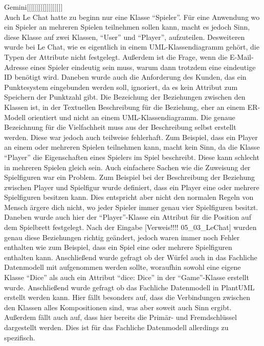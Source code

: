 Gemini[[[[[[[[[]]]]]]]]]\\

Auch Le Chat hatte zu beginn nur eine Klasse ``Spieler''. Für eine Anwendung wo ein Spieler an mehreren Spielen teilnehmen sollen kann, macht es jedoch Sinn, diese 
Klasse auf zwei Klassen, ``User'' und ``Player'', aufzuteilen. Desweiteren wurde bei Le Chat, wie es eigentlich in einem UML-Klassendiagramm gehört, die Typen der
Attribute nicht festgelegt. Außerdem ist die Frage, wenn die E-Mail-Adresse eines Spieler eindeutig sein muss, warum dann trotzdem eine eindeutige ID benötigt wird.
Daneben wurde auch die Anforderung des Kunden, das ein Punktesystem eingebunden werden soll, ignoriert, da es kein Attribut zum Speichern der Punktzahl gibt.
Die Bezeichung der Beziehungen zwischen den Klassen ist, in der Textuellen Beschreibung für die Beziehung, eher an einem ER-Modell orientiert und nicht an einem 
UML-Klassendiagramm. Die genaue Bezeichnung für die Vielfachheit muss aus der Beschreibung selbst erstellt werden. Diese war jedoch auch teilweise fehlerhaft. Zum 
Beispiel, dass ein Player an einem oder mehreren Spielen teilnehmen kann, macht kein Sinn, da die Klasse ``Player'' die Eigenschaften eines Spielers
im Spiel beschreibt. Diese kann schlecht in mehreren Spielen gleich sein. Auch einfachere Sachen wie die Zuweisung der Spielfiguren war ein Problem. Zum Beispiel bei 
der Beschreibung der Beziehung zwischen Player und Spielfigur wurde definiert, dass ein Player eine oder mehrere Spielfiguren besitzen kann. Dies entspricht aber nicht 
den normalen Regeln von Mensch ärgere dich nicht, wo jeder Spieler immer genau vier Spielfiguren besitzt. Daneben wurde auch hier der ``Player''-Klasse ein Attribut
für die Position auf dem Spielbrett festgelegt. Nach der Eingabe [Verweis!!!! 05\_03\_LeChat] wurden genau diese Beziehungen richtig geändert, jedoch waren immer noch Fehler enthalten
wie zum Beispiel, dass ein Spiel eine oder mehrere Spielfiguren enthalten kann. Anschließend wurde gefragt ob der Würfel auch in das Fachliche Datenmodell mit aufgenommen
werden sollte, woraufhin sowohl eine eigene Klasse ``Dice'' als auch ein Attribut ``dice: Dice'' in der ``Game''-Klasse erstellt wurde. Anschließend wurde gefragt ob 
das Fachliche Datenmodell in PlantUML erstellt werden kann. Hier fällt besonders auf, dass die Verbindungen zwischen den Klassen alles Kompositionen sind, was aber soweit
auch Sinn ergibt. Außerdem fällt auch auf, dass hier bereits die Primär- und Fremdschlüssel dargestellt werden. Dies ist für das Fachliche Datenmodell allerdings zu spezifisch.
